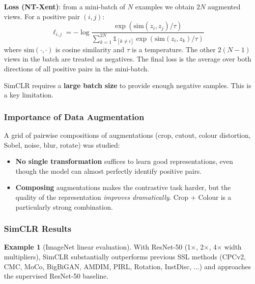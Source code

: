 \documentclass[11pt,a4paper]{article}
\theoremstyle{definition}
\newtheorem{example}{Example}[section]
\theoremstyle{plain}
\theoremstyle{remark}
\begin{document}
\textbf{Loss (NT-Xent)}: from a mini-batch of $N$ examples we obtain $2N$ augmented views. For a positive pair $(i,j)$:
\begin{equation}
\ell_{i,j} = -\log \frac{\exp(\mathrm{sim}(z_i,z_j)/\tau)}{\sum_{k=1}^{2N} \mathbb{1}_{[k\neq i]} \exp(\mathrm{sim}(z_i,z_k)/\tau)}
\end{equation}
where $\mathrm{sim}(\cdot,\cdot)$ is cosine similarity and $\tau$ is a temperature. The other $2(N-1)$ views in the batch are treated as negatives. The final loss is the average over both directions of all positive pairs in the mini-batch.

\begin{tcolorbox}[colback=yellow!5!white,colframe=orange!80!black,title=\textbf{Important Practical Note}]
SimCLR requires a \textbf{large batch size} to provide enough negative samples. This is a key limitation.
\end{tcolorbox}

\subsubsection{Importance of Data Augmentation}

A grid of pairwise compositions of augmentations (crop, cutout, colour distortion, Sobel, noise, blur, rotate) was studied:
\begin{itemize}
    \item \textbf{No single transformation} suffices to learn good representations, even though the model can almost perfectly identify positive pairs.
    \item \textbf{Composing} augmentations makes the contrastive task harder, but the quality of the representation \emph{improves dramatically}. Crop + Colour is a particularly strong combination.
\end{itemize}

\subsubsection{SimCLR Results}

\begin{example}[ImageNet linear evaluation]
With ResNet-50 (1$\times$, 2$\times$, 4$\times$ width multipliers), SimCLR substantially outperforms previous SSL methods (CPCv2, CMC, MoCo, BigBiGAN, AMDIM, PIRL, Rotation, InstDisc, $\ldots$) and approaches the supervised ResNet-50 baseline.
\end{example}
\end{document}
